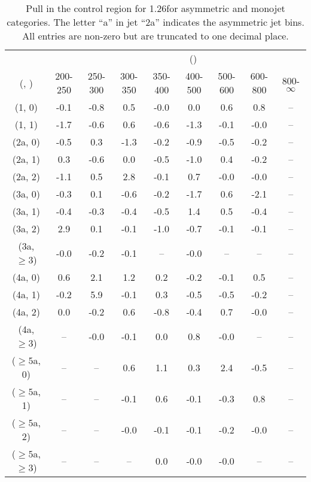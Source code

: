 \begin{table}[h!]
\tiny
\centering
\caption{Pull in the \mmj control region for 1.26\ifb for asymmetric and monojet categories. The letter ``a'' in jet \eg ``2a''  indicates the asymmetric jet bins. All entries are non-zero but are truncated to one decimal place.\label{tab:pullsep_ewk_mumu_asym}}
\begin{tabular}
{ccccccccc}
	\hline\hline
&	& \multicolumn{8}{c}{\scalht (\gev)} \\ 
	 (\njet,  \nb) & 200-250 & 250-300 & 300-350 & 350-400 & 400-500 & 500-600 & 600-800 & 800-$\infty$ \\ [0.8ex] 
\hline
	(1, 0) & -0.1 & -0.8 & 0.5 & -0.0 & 0.0 & 0.6 & 0.8 & -- \\[0.5ex] 
	(1, 1) & -1.7 & -0.6 & 0.6 & -0.6 & -1.3 & -0.1 & -0.0 & -- \\[0.5ex] 
	(2a, 0) & -0.5 & 0.3 & -1.3 & -0.2 & -0.9 & -0.5 & -0.2 & -- \\[0.5ex] 
	(2a, 1) & 0.3 & -0.6 & 0.0 & -0.5 & -1.0 & 0.4 & -0.2 & -- \\[0.5ex] 
	(2a, 2) & -1.1 & 0.5 & 2.8 & -0.1 & 0.7 & -0.0 & -0.0 & -- \\[0.5ex] 
	(3a, 0) & -0.3 & 0.1 & -0.6 & -0.2 & -1.7 & 0.6 & -2.1 & -- \\[0.5ex] 
	(3a, 1) & -0.4 & -0.3 & -0.4 & -0.5 & 1.4 & 0.5 & -0.4 & -- \\[0.5ex] 
	(3a, 2) & 2.9 & 0.1 & -0.1 & -1.0 & -0.7 & -0.1 & -0.1 & -- \\[0.5ex] 
	(3a, $\ge3$) & -0.0 & -0.2 & -0.1 & -- & -0.0 & -- & -- & -- \\[0.5ex] 
	(4a, 0) & 0.6 & 2.1 & 1.2 & 0.2 & -0.2 & -0.1 & 0.5 & -- \\[0.5ex] 
	(4a, 1) & -0.2 & 5.9 & -0.1 & 0.3 & -0.5 & -0.5 & -0.2 & -- \\[0.5ex] 
	(4a, 2) & 0.0 & -0.2 & 0.6 & -0.8 & -0.4 & 0.7 & -0.0 & -- \\[0.5ex] 
	(4a, $\ge3$) & -- & -0.0 & -0.1 & 0.0 & 0.8 & -0.0 & -- & -- \\[0.5ex] 
	($\ge5$a, 0) & -- & -- & 0.6 & 1.1 & 0.3 & 2.4 & -0.5 & -- \\[0.5ex] 
	($\ge5$a, 1) & -- & -- & -0.1 & 0.6 & -0.1 & -0.3 & 0.8 & -- \\[0.5ex] 
	($\ge5$a, 2) & -- & -- & -0.0 & -0.1 & -0.1 & -0.2 & -0.0 & -- \\[0.5ex] 
	($\ge5$a, $\ge3$) & -- & -- & -- & 0.0 & -0.0 & -0.0 & -- & -- \\[0.5ex] 
	\hline
	\hline
\end{tabular}
\end{table}

